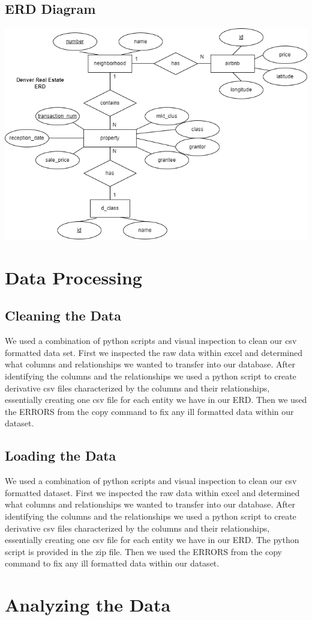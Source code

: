 \documentclass[]{article}
\begin{document}
\subsection{ERD Diagram}
\includegraphics[scale = 0.75]{ERD2}

\section{Data Processing}
\subsection{Cleaning the Data}
We used a combination of python scripts and visual inspection to clean our csv formatted data set. First we inspected the raw data within excel and determined what columns and relationships we wanted to transfer into our database. After identifying the columns and the relationships we used a python script to create derivative csv files characterized by the columns and their relationships, essentially creating one csv file for each entity we have in our ERD. Then we used the ERRORS from the copy command to fix any ill formatted data within our dataset. 

\subsection{Loading the Data}
We used a combination of python scripts and visual inspection to clean our csv formatted dataset. First we inspected the raw data within excel and determined what columns and relationships we wanted to transfer into our database. After identifying the columns and the relationships we used a python script to create derivative csv files characterized by the columns and their relationships, essentially creating one csv file for each entity we have in our ERD. The python script is provided in the zip file. Then we used the ERRORS from the copy command to fix any ill formatted data within our dataset. 

\section{Analyzing the Data}
\end{document}
